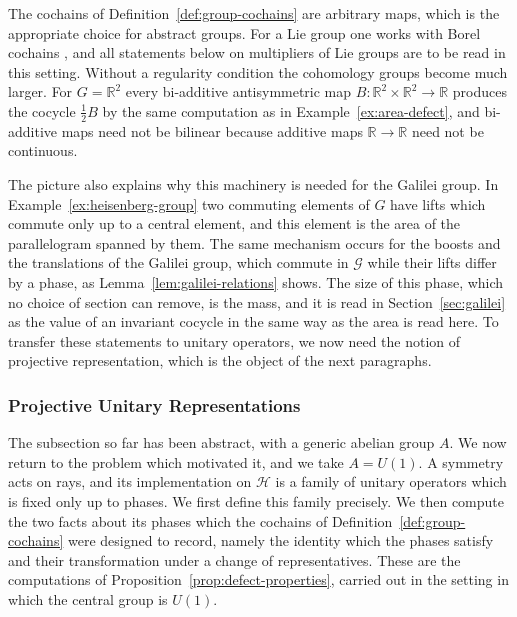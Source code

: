 \begin{remark}\label{rem:topological-groups}
	The cochains of Definition~\ref{def:group-cochains} are arbitrary maps, which is the appropriate choice for abstract groups. For a Lie group one works with Borel cochains \cite[TODO-location]{TODO-Varadarajan1985}, and all statements below on multipliers of Lie groups are to be read in this setting. Without a regularity condition the cohomology groups become much larger. For $G=\mathbb{R}^2$ every bi-additive antisymmetric map $B:\mathbb{R}^2\times\mathbb{R}^2\to\mathbb{R}$ produces the cocycle $\frac12B$ by the same computation as in Example~\ref{ex:area-defect}, and bi-additive maps need not be bilinear because additive maps $\mathbb{R}\to\mathbb{R}$ need not be continuous.
\end{remark}

The picture also explains why this machinery is needed for the Galilei group. In Example~\ref{ex:heisenberg-group} two commuting elements of $G$ have lifts which commute only up to a central element, and this element is the area of the parallelogram spanned by them. The same mechanism occurs for the boosts and the translations of the Galilei group, which commute in $\mathcal{G}$ while their lifts differ by a phase, as Lemma~\ref{lem:galilei-relations} shows. The size of this phase, which no choice of section can remove, is the mass, and it is read in Section~\ref{sec:galilei} as the value of an invariant cocycle in the same way as the area is read here. To transfer these statements to unitary operators, we now need the notion of projective representation, which is the object of the next paragraphs.

\subsubsection*{Projective Unitary Representations}

The subsection so far has been abstract, with a generic abelian group $A$. We now return to the problem which motivated it, and we take $A=U(1)$. A symmetry acts on rays, and its implementation on $\mathcal{H}$ is a family of unitary operators which is fixed only up to phases. We first define this family precisely. We then compute the two facts about its phases which the cochains of Definition~\ref{def:group-cochains} were designed to record, namely the identity which the phases satisfy and their transformation under a change of representatives. These are the computations of Proposition~\ref{prop:defect-properties}, carried out in the setting in which the central group is $U(1)$.

